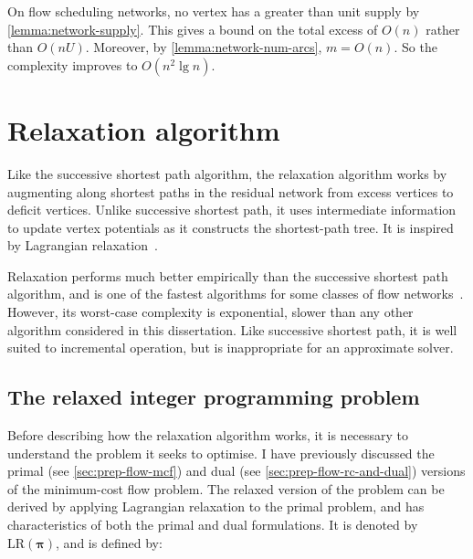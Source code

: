 \begin{remark} \label{remark:ssp-flow-scheduling-complexity}
On flow scheduling networks, no vertex has a greater than unit supply by \cref{lemma:network-supply}. This gives a bound on the total excess of $O(n)$ rather than $O(nU)$. Moreover, by \cref{lemma:network-num-arcs}, $m = O(n)$. So the complexity improves to $O(n^2 \lg n)$.
\end{remark}

\section{Relaxation algorithm} \label{sec:impl-relax}


Like the successive shortest path algorithm, the relaxation algorithm works by augmenting along shortest paths in the residual network from excess vertices to deficit vertices. Unlike successive shortest path, it uses intermediate information to update vertex potentials as it constructs the shortest-path tree. It is inspired by Lagrangian relaxation~\cite[ch.~16]{Ahuja:1993}\cite{Fisher:1981}.

Relaxation performs much better empirically than the successive shortest path algorithm, and is one of the fastest algorithms for some classes of flow networks~\cite{KiralyKovacs:2012}. However, its worst-case complexity is exponential, slower than any other algorithm considered in this dissertation\footnotemark. Like successive shortest path, it is well suited to incremental operation, but is inappropriate for an approximate solver.

\subsection{The relaxed integer programming problem}
Before describing how the relaxation algorithm works, it is necessary to understand the problem it seeks to optimise. I have previously discussed the primal (see \cref{sec:prep-flow-mcf}) and dual (see \cref{sec:prep-flow-rc-and-dual}) versions of the minimum-cost flow problem. The relaxed version of the problem can be derived by applying Lagrangian relaxation to the primal problem, and has characteristics of both the primal and dual formulations. It is denoted by $\mathrm{LR}(\boldsymbol{\pi})$, and is defined by:

